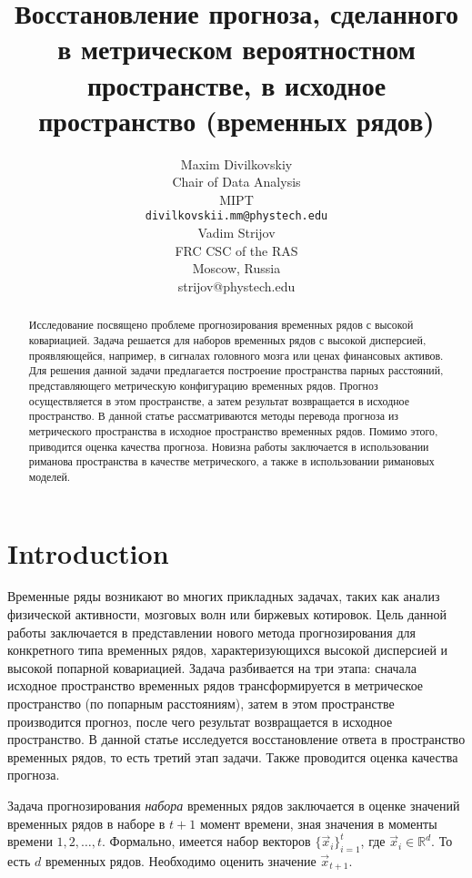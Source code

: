 \documentclass{article}
\title{Восстановление прогноза, сделанного в метрическом вероятностном пространстве, в исходное пространство (временных рядов)}
\author{ Maxim Divilkovskiy \\
	Chair of Data Analysis\\
	MIPT\\
	\texttt{divilkovskii.mm@phystech.edu} \\
	\And
	Vadim Strijov \\
	FRC CSC of the RAS\\
	Moscow, Russia\\
        strijov@phystech.edu \\
}
\date{}
\begin{document}
\maketitle

\begin{abstract}
	Исследование посвящено проблеме прогнозирования временных рядов с высокой ковариацией. Задача решается для наборов временных рядов с высокой дисперсией, проявляющейся, например, в сигналах головного мозга или ценах финансовых активов. Для решения данной задачи предлагается построение пространства парных расстояний, представляющего метрическую конфигурацию временных рядов. Прогноз осуществляется в этом пространстве, а затем результат возвращается в исходное пространство.
	В данной статье рассматриваются методы перевода прогноза из метрического пространства в исходное пространство временных рядов. Помимо этого, приводится оценка качества прогноза. Новизна работы заключается в использовании риманова пространства в качестве метрического, а также в использовании римановых моделей.


\end{abstract}



\section{Introduction}
	Временные ряды возникают во многих прикладных задачах, таких как анализ физической активности, мозговых волн или биржевых котировок. Цель данной работы заключается в представлении нового метода прогнозирования для конкретного типа временных рядов, характеризующихся высокой дисперсией и высокой попарной ковариацией. Задача разбивается на три этапа: сначала исходное пространство временных рядов трансформируется в метрическое пространство (по попарным расстояниям), затем в этом пространстве производится прогноз, после чего результат возвращается в исходное пространство. В данной статье исследуется восстановление ответа в пространство временных рядов, то есть третий этап задачи. Также проводится оценка качества прогноза.
	
	Задача прогнозирования \textit{набора} временных рядов заключается в оценке значений временных рядов в наборе в $t+1$ момент времени, зная значения в моменты времени $1, 2, \ldots, t$. Формально, имеется набор векторов $\{\vec{x}_i\}_{i=1}^t$, где $\vec{x}_i \in \mathbb{R}^d$. То есть $d$ временных рядов. Необходимо оценить значение $\vec{x}_{t+1}$.
	
\end{document}
